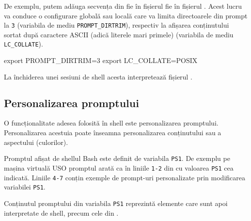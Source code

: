 De exemplu, putem adăuga secvența din  fie în fișierul  fie în fișierul . Acest lucru va conduce o configurare globală sau locală care va limita directoarele din prompt la \texttt{3} (variabila de mediu \texttt{PROMPT\_DIRTRIM}), respectiv la afișarea conținutului sortat după caractere ASCII (adică literele mari primele) (variabila de mediu \texttt{LC\_COLLATE}).

\begin{screen}[caption={Configurare în Bash (bashrc)},label={lst:cli:config-bashrc}]
export PROMPT_DIRTRIM=3
export LC_COLLATE=POSIX
\end{screen}

La închiderea unei sesiuni de shell acesta interpretează fișierul .

\subsection{Personalizarea promptului}
\label{sec:cli:shell-start:prompt}

O funcționalitate adesea folosită în shell este personalizarea promptului.
Personalizarea acestuia poate înseamna personalizarea conținutului sau a
aspectului (culorilor).

Promptul afișat de shellul Bash este definit de variabila \texttt{PS1}. De exemplu pe
mașina virtuală USO promptul arată ca în liniile \texttt{1-2} din  cu valoarea \texttt{PS1} cea indicată. Liniile \texttt{4-7} conțin exemple de prompt-uri personalizate prin modificarea variabilei \texttt{PS1}.

\begin{screen}[caption={Personalizarea prompt-ului},label={lst:cli:custom-prompt}]
student@uso:~$
student@uso:~$ echo $PS1
${debian_chroot:+($debian_chroot)}\[\033[01;32m\]\u@\h\[\033[00m\]:\[\033[01;34m\]\w\[\033[00m\]\$
student@uso:[23:00:06]:~$ echo $PS1
${debian_chroot:+($debian_chroot)}\[\033[01;32m\]\u@\h\[\033[00m\]:[\t]:\[\033[01;34m\]\w\[\033[00m\]\$
student@uso:[11:02 PM]:~$ echo $PS1
${debian_chroot:+($debian_chroot)}\[\033[01;32m\]\u@\h\[\033[00m\]:[\@]:\[\033[01;34m\]\w\[\033[00m\]\$
\end{screen}

Conținutul promptului din variabila \texttt{PS1} reprezintă elemente care sunt apoi
interpretate de shell, precum cele din .

